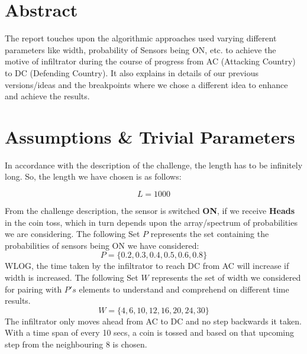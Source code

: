 \documentclass[12pt]{article}
\begin{document}
\maketitle


\section{Abstract}
The report touches upon the algorithmic approaches used varying different parameters like width, probability of Sensors being ON, etc. to achieve the motive of infiltrator during the course of progress from AC (Attacking Country) to DC (Defending Country).
It also explains in details of our previous versions/ideas and the breakpoints where we chose a different idea to enhance and achieve the results.


\section{Assumptions \& Trivial Parameters}
In accordance with the description of the challenge, the length has to be infinitely long. So, the length we have chosen is as follows:

\begin{equation*}
    L = 1000
\end{equation*}

From the challenge description, the sensor is switched \textbf{ON}, if we receive \textbf{Heads} in the coin toss, which in turn depends upon the array/spectrum of probabilities we are considering.
The following Set $P$ represents the set containing the probabilities of sensors being ON we have considered:
\begin{equation*}
    P = \{0.2, 0.3, 0.4, 0.5, 0.6, 0.8\}
\end{equation*}
WLOG, the time taken by the infiltrator to reach DC from AC will increase if width is increased. The following Set $W$ represents the set of width we considered for pairing with $P's$ elements to understand and comprehend on different time results.
\begin{equation*}
    W = \{4, 6, 10, 12, 16, 20, 24, 30\}
\end{equation*}
The infiltrator only moves ahead from AC to DC and no step backwards it taken. With a time span of every 10 secs, a coin is tossed and based on that upcoming step from the neighbouring 8 is chosen.
\end{document}
